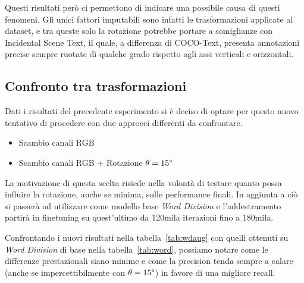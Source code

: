 Questi risultati però ci permettono di indicare una possibile causa di questi fenomeni. Gli unici fattori imputabili sono infatti le trasformazioni applicate al dataset, e tra queste solo la rotazione potrebbe portare a somiglianze con Incidental Scene Text, il quale, a differenza di COCO-Text, presenta annotazioni precise sempre ruotate di qualche grado rispetto agli assi verticali e orizzontali.




\subsection{Confronto tra trasformazioni}
\label{subsec:train_wdaug}
Dati i risultati del precedente esperimento si è deciso di optare per questo nuovo tentativo di procedere con due approcci differenti da confrontare. 
\begin{itemize}
	\item
		Scambio canali RGB
	\item
		Scambio canali RGB + Rotazione $\theta = 15\text{\textdegree}$
\end{itemize}

La motivazione di questa scelta risiede nella volontà di testare quanto possa influire la rotazione, anche se minima, sulle performance finali. In aggiunta a ciò si passerà ad utilizzare come modello base \textit{Word Division} e l'addestramento partirà in finetuning su quest'ultimo da 120mila iterazioni fino a 180mila.\par
Confrontando i nuovi risultati nella tabella~\ref{tab:wdaug} con quelli ottenuti su \textit{Word Division} di base nella tabella~\ref{tab:word}, possiamo notare come le differenze prestazionali siano minime e come la precision tenda sempre a calare (anche se impercettibilmente con $\theta = 15\text{\textdegree}$) in favore di una migliore recall.

